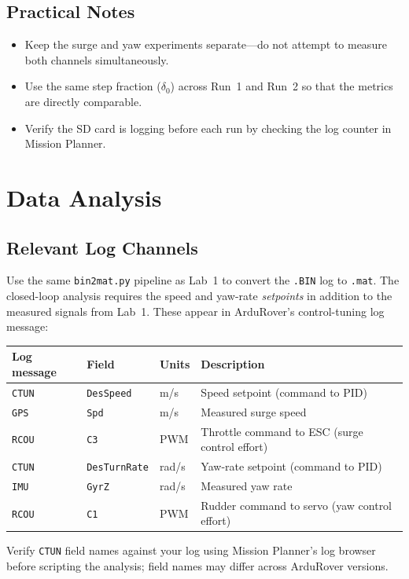 \documentclass[../../book.tex]{subfiles}
\begin{document}
\subsection{Practical Notes}

\begin{itemize}
  \item Keep the surge and yaw experiments separate---do not attempt to measure both channels simultaneously.
  \item Use the same step fraction ($\delta_0$) across Run~1 and Run~2 so that the metrics are directly comparable.
  \item Verify the SD card is logging before each run by checking the log counter in Mission Planner.
\end{itemize}

\section{Data Analysis}

\subsection{Relevant Log Channels}

Use the same \texttt{bin2mat.py} pipeline as Lab~1 to convert the \texttt{.BIN} log to \texttt{.mat}.  The closed-loop analysis requires the speed and yaw-rate \emph{setpoints} in addition to the measured signals from Lab~1.  These appear in ArduRover's control-tuning log message:

\vspace{6pt}
\begin{center}
\begin{tabular}{L{2.8cm} L{2.8cm} C{1.8cm} L{5.0cm}}
  \textbf{Log message} & \textbf{Field} & \textbf{Units} & \textbf{Description} \\
  \midrule
  \texttt{CTUN} & \texttt{DesSpeed}    & m/s   & Speed setpoint (command to PID) \\[3pt]
  \texttt{GPS}  & \texttt{Spd}         & m/s   & Measured surge speed \\[3pt]
  \texttt{RCOU} & \texttt{C3}          & PWM   & Throttle command to ESC (surge control effort) \\[5pt]
  \texttt{CTUN} & \texttt{DesTurnRate} & rad/s & Yaw-rate setpoint (command to PID) \\[3pt]
  \texttt{IMU}  & \texttt{GyrZ}        & rad/s & Measured yaw rate \\[3pt]
  \texttt{RCOU} & \texttt{C1}          & PWM   & Rudder command to servo (yaw control effort) \\[3pt]
  \bottomrule
\end{tabular}
\end{center}
\vspace{4pt}
{\small Verify \texttt{CTUN} field names against your log using Mission Planner's log browser before scripting the analysis; field names may differ across ArduRover versions.}
\vspace{6pt}
\end{document}
